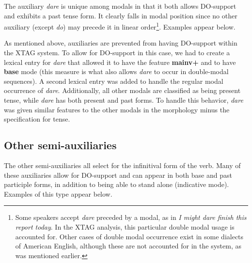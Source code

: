 The auxiliary {\it dare} is unique among modals in that it both allows
DO-support and exhibits a past tense form.  It clearly falls in modal position
since no other auxiliary (except {\it do}) may precede it in linear
order\footnote{Some speakers accept {\it dare} preceded by a modal, as in {\it
I might dare finish this report today}.  In the XTAG analysis, this particular
double modal usage is accounted for.  Other cases of double modal occurrence
exist in some dialects of American English,  although these are not accounted
for in the system, as was mentioned earlier.\label{dare-footnote}}.  Examples appear below.


As mentioned above, auxiliaries are prevented from having DO-support within the
XTAG system.  To allow for DO-support in this case, we had to create a lexical
entry for {\it dare} that allowed it to have the feature {\bf
mainv+} and to have {\bf base} mode (this measure is
what also allows {\it dare} to occur in double-modal sequences).  A second
lexical entry was added to handle the regular modal occurrence of {\it dare}.
Additionally, all other modals are classified as being present tense, while
{\it dare} has both present and past forms.  To handle this behavior, {\it
dare} was given similar features to the other modals in the morphology minus
the specification for tense. 

\subsection{Other semi-auxiliaries}

The other semi-auxiliaries all select for the infinitival form of the verb.
Many of these auxiliaries allow for DO-support and can appear in both base and
past participle forms, in addition to being able to stand alone (indicative 
mode).  Examples of this type appear below.


